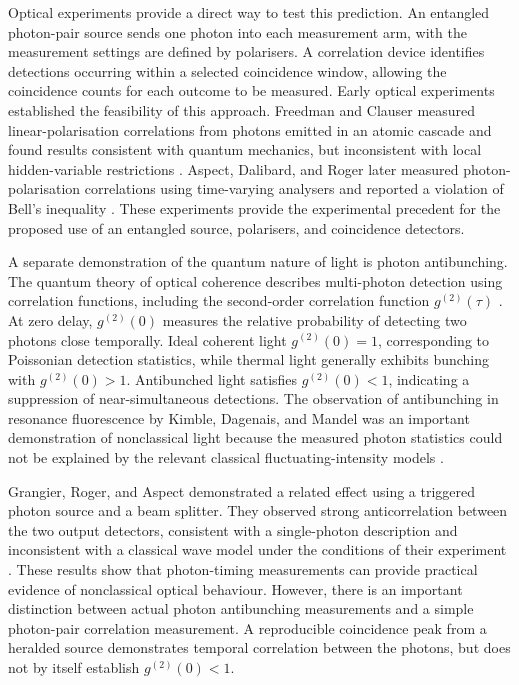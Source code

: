 \documentclass{article}
\begin{document}
Optical experiments provide a direct way to test this prediction. An entangled photon-pair source sends one photon into each measurement arm, with the measurement settings are defined by polarisers. A correlation device identifies detections occurring within a selected coincidence window, allowing the coincidence counts for each outcome to be measured. Early optical experiments established the feasibility of this approach. Freedman and Clauser measured linear-polarisation correlations from photons emitted in an atomic cascade and found results consistent with quantum mechanics, but inconsistent with local hidden-variable restrictions \parencite{freedmanExperimentalTestLocal1972}. Aspect, Dalibard, and Roger later measured photon-polarisation correlations using time-varying analysers and reported a violation of Bell's inequality \parencite{aspectExperimentalTestBells1982}. These experiments provide the experimental precedent for the proposed use of an entangled source, polarisers, and coincidence detectors.

A separate demonstration of the quantum nature of light is photon antibunching. The quantum theory of optical coherence describes multi-photon detection using correlation functions, including the second-order correlation function $g^{(2)}(\tau )$ \parencite{glauberQuantumTheoryOptical1963}. At zero delay, $g^{(2)}(0)$ measures the relative probability of detecting two photons close temporally. Ideal coherent light $g^{(2)}(0)=1$, corresponding to Poissonian detection statistics, while thermal light generally exhibits bunching with $g^{(2)}(0)>1$. Antibunched light satisfies $g^{(2)}(0)<1$, indicating a suppression of near-simultaneous detections. The observation of antibunching in resonance fluorescence by Kimble, Dagenais, and Mandel was an important demonstration of nonclassical light because the measured photon statistics could not be explained by the relevant classical fluctuating-intensity models \parencite{kimblePhotonAntibunchingResonance1977}.

Grangier, Roger, and Aspect demonstrated a related effect using a triggered photon source and a beam splitter. They observed strong anticorrelation between the two output detectors, consistent with a single-photon description and inconsistent with a classical wave model under the conditions of their experiment \parencite{grangierExperimentalEvidencePhoton1986}. These results show that photon-timing measurements can provide practical evidence of nonclassical optical behaviour. However, there is an important distinction between actual photon antibunching measurements and a simple photon-pair correlation measurement. A reproducible coincidence peak from a heralded source demonstrates temporal correlation between the photons, but does not by itself establish $g^{(2)}(0)<1$.
\end{document}
